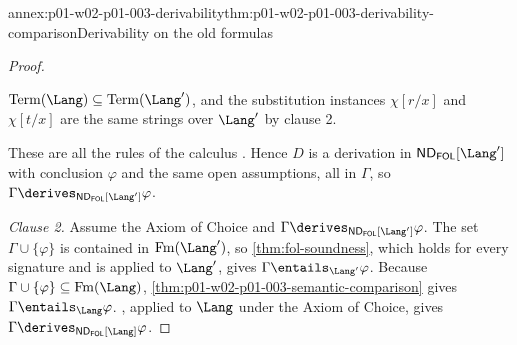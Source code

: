 \begin{annexitem}{annex:p01-w02-p01-003-derivability}{thm:p01-w02-p01-003-derivability-comparison}{Derivability on the old formulas}
\begin{proof}
\begin{itemize}
        \(\operatorname{Term}(\Lang)\subseteq\operatorname{Term}(\Lang')\),
        and the substitution instances \(\chi[r/x]\) and \(\chi[t/x]\) are
        the same strings over \(\Lang'\) by clause 2.
\end{itemize}
These are all the rules of the calculus
\cite[ch.~``First-Order Deduction'', section ``Natural-deduction rules for
quantifiers and equality'']{FrozenFormalLogicLanguageChange}. Hence \(D\) is a
derivation in \(\mathsf{ND}_{\mathsf{FOL}}[\Lang']\) with conclusion
\(\varphi\) and the same open assumptions, all in \(\Gamma\), so
\(\Gamma\derives_{\mathsf{ND}_{\mathsf{FOL}}[\Lang']}\varphi\).

\emph{Clause 2.} Assume the Axiom of Choice and
\(\Gamma\derives_{\mathsf{ND}_{\mathsf{FOL}}[\Lang']}\varphi\). The set
\(\Gamma\cup\{\varphi\}\) is contained in \(\operatorname{Fm}(\Lang')\), so
\cref{thm:fol-soundness}, which holds for every signature and is applied to
\(\Lang'\), gives \(\Gamma\entails_{\Lang'}\varphi\). Because
\(\Gamma\cup\{\varphi\}\subseteq\operatorname{Fm}(\Lang)\),
\cref{thm:p01-w02-p01-003-semantic-comparison} gives
\(\Gamma\entails_{\Lang}\varphi\). , applied to
\(\Lang\) under the Axiom of Choice, gives
\(\Gamma\derives_{\mathsf{ND}_{\mathsf{FOL}}[\Lang]}\varphi\).
\end{proof}
\end{annexitem}

